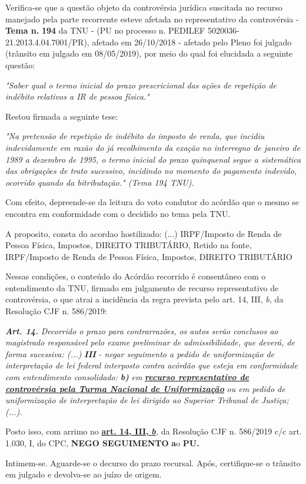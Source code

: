 \documentclass[12pt]{article}
\begin{document}
\justifying
\noindent Verifica-se que a questão objeto da controvérsia jurídica suscitada no recurso manejado pela parte recorrente esteve afetada no representativo da controvérsia - \textbf{Tema n. }\textbf{194} da TNU - (PU no processo n. PEDILEF 5020036-21.2013.4.04.7001/PR),  afetado em 26/10/2018 - afetado pelo Pleno foi julgado (trânsito em julgado em 08/05/2019), por meio do qual foi elucidada a seguinte questão:

\noindent \textit{"Saber qual o termo inicial do prazo prescricional das ações de repetição de indébito relativos a IR de pessoa física."}

\noindent Restou firmada a seguinte tese:

\noindent \textit{"Na pretensão de repetição de indébito do imposto de renda, que incidiu indevidamente em razão do já recolhimento da exação no interregno de janeiro de 1989 a dezembro de 1995, o termo inicial do prazo quinquenal segue a sistemática das obrigações de trato sucessivo, incidindo no momento do pagamento indevido, ocorrido quando da bitributação." (Tema 194 TNU).}

\noindent Com efeito, depreende-se da leitura do voto condutor do acórdão que o mesmo se encontra em conformidade com o decidido no  tema pela TNU.

\noindent A proposito, consta do acordao hostilizado: (...) IRPF/Imposto de Renda de Pessoa Física, Impostos, DIREITO TRIBUTÁRIO, Retido na fonte, IRPF/Imposto de Renda de Pessoa Física, Impostos, DIREITO TRIBUTÁRIO

\noindent Nessas condições, o conteúdo do Acórdão recorrido é consentâneo com o entendimento da TNU, firmado em julgamento de recurso representativo de controvérsia, o que atrai a incidência da regra prevista pelo art. 14, III, \textit{b,} da Resolução CJF n. 586/2019:

\noindent \textit{\textbf{Art. 14.}}\textit{ Decorrido o prazo para contrarrazões, os autos serão conclusos ao magistrado responsável pelo exame preliminar de admissibilidade, que deverá, de forma sucessiva: (...) }\textit{\textbf{III }}\textit{- negar seguimento a pedido de uniformização de interpretação de lei federal interposto contra acórdão que esteja em conformidade com entendimento consolidado: }\textit{\textbf{b)}}\textit{ em }\uline{\textit{\textbf{recurso representativo de controvérsia pela Turma Nacional de Uniformização}}}\textit{ ou em pedido de uniformização de interpretação de lei dirigido ao Superior Tribunal de Justiça;(...).}

\noindent Posto isso, com arrimo no \uline{\textbf{art. 14, III, }}\uline{\textit{\textbf{b}}}\textit{,} da Resolução CJF n. 586/2019 c/c art. 1.030, I, do CPC, \textbf{NEGO SEGUIMENTO }\textbf{a}o\textbf{ PU}\textbf{.}

\noindent Intimem-se. Aguarde-se o decurso do prazo recursal. Após, certifique-se o trânsito em julgado e devolva-se ao juízo de origem.
\end{document}
